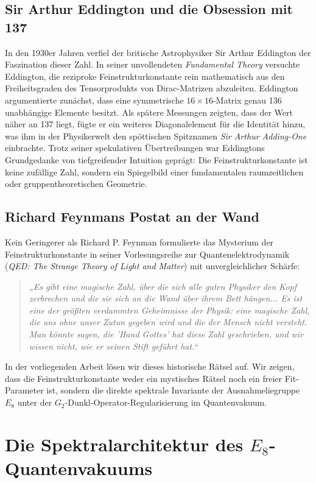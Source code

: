 \documentclass[11pt,a4paper]{article}
\begin{document}
	\subsection{Sir Arthur Eddington und die Obsession mit 137}
	In den 1930er Jahren verfiel der britische Astrophysiker Sir Arthur Eddington der Faszination dieser Zahl. In seiner unvollendeten \emph{Fundamental Theory} versuchte Eddington, die reziproke Feinstrukturkonstante rein mathematisch aus den Freiheitsgraden des Tensorprodukts von Dirac-Matrizen abzuleiten. Eddington argumentierte zunächst, dass eine symmetrische $16 \times 16$-Matrix genau 136 unabhängige Elemente besitzt. Als spätere Messungen zeigten, dass der Wert näher an 137 liegt, fügte er ein weiteres Diagonalelement für die Identität hinzu, was ihm in der Physikerwelt den spöttischen Spitznamen \emph{Sir Arthur Adding-One} einbrachte. Trotz seiner spekulativen Übertreibungen war Eddingtons Grundgedanke von tiefgreifender Intuition geprägt: Die Feinstrukturkonstante ist keine zufällige Zahl, sondern ein Spiegelbild einer fundamentalen raumzeitlichen oder gruppentheoretischen Geometrie.
	
	\subsection{Richard Feynmans Postat an der Wand}
	Kein Geringerer als Richard P. Feynman formulierte das Mysterium der Feinstrukturkonstante in seiner Vorlesungsreihe zur Quantenelektrodynamik (\emph{QED: The Strange Theory of Light and Matter}) mit unvergleichlicher Schärfe:
	\begin{quote}
		\em „Es gibt eine magische Zahl, über die sich alle guten Physiker den Kopf zerbrechen und die sie sich an die Wand über ihrem Bett hängen... Es ist eine der größten verdammten Geheimnisse der Physik: eine magische Zahl, die uns ohne unser Zutun gegeben wird und die der Mensch nicht versteht. Man könnte sagen, die 'Hand Gottes' hat diese Zahl geschrieben, und wir wissen nicht, wie er seinen Stift geführt hat.“
	\end{quote}
	
	In der vorliegenden Arbeit lösen wir dieses historische Rätsel auf. Wir zeigen, dass die Feinstrukturkonstante weder ein mystisches Rätsel noch ein freier Fit-Parameter ist, sondern die direkte spektrale Invariante der Ausnahmeliegruppe $E_8$ unter der $G_2$-Dunkl-Operator-Regularisierung im Quantenvakuum.
	
	\section{Die Spektralarchitektur des $E_8$-Quantenvakuums}
	
\end{document}
